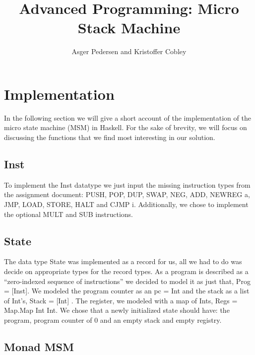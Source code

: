 \documentclass[]{article}
\title{Advanced Programming: Micro Stack Machine}
\author{ Asger Pedersen and Kristoffer Cobley}
\begin{document}
\ifpdf
{}
\else
{}
\fi

\maketitle
\setcounter{tocdepth}{1}
\tableofcontents
\newpage

\section{Implementation}

In the following section we will give a short account of the implementation of the micro state machine (MSM) in Haskell. For the sake of brevity, we will focus on discussing the functions that we find most interesting in our solution.\par

\subsection{Inst}

To implement the Inst datatype we just input the missing instruction types from the assignment document: PUSH, POP, DUP, SWAP, NEG, ADD, NEWREG a, JMP, LOAD, STORE, HALT and CJMP i. Additionally, we chose to implement the optional MULT and SUB instructions. \par

\subsection{State}

The data type State was implemented as a record for us, all we had to do was decide on appropriate types for the record types. As a program is described as a “zero-indexed sequence of instructions” we decided to model it as just that, Prog = [Inst]. We modeled the program counter as an pc = Int and the stack as a list of Int’s, Stack = [Int] . The register, we modeled with a map of Ints, Regs = Map.Map Int Int. 
We chose that a newly initialized state should have: the program, program counter of 0 and an empty stack and empty registry.\par

\subsection{Monad MSM}
\end{document}

